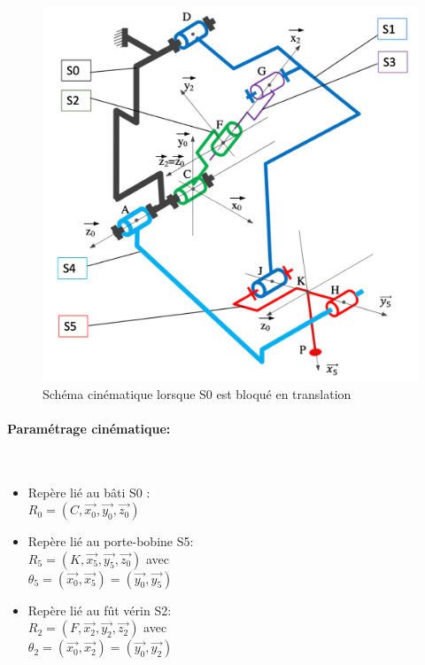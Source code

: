 \begin{figure}
\vspace{-1cm}
\begin{center}
 \includegraphics[width=0.9\linewidth]{img/fig06}
\end{center}
\caption{Schéma cinématique lorsque S0 est bloqué en translation}
\label{fig06}
\end{figure}

\paragraph{Paramétrage cinématique:} ~\
\begin{itemize}
 \item Repère lié au bâti S0 : \\
$R_0=(C,\overrightarrow{x_0},\overrightarrow{y_0},\overrightarrow{z_0})$
 \item Repère lié au porte-bobine S5: \\   
$R_5=(K,\overrightarrow{x_5},\overrightarrow{y_5},\overrightarrow{z_0})$
 avec \\ $\theta_5=(\overrightarrow{x_0},\overrightarrow{x_5})=(\overrightarrow{y_0},\overrightarrow{y_5})$
 \item Repère lié au fût vérin S2: \\
$R_2=(F,\overrightarrow{x_2},\overrightarrow{y_2},\overrightarrow{z_2})$ 
avec \\ $\theta_{2}=(\overrightarrow{x_0},\overrightarrow{x_2})=(\overrightarrow{y_0},\overrightarrow{y_2})$
\end{itemize}

